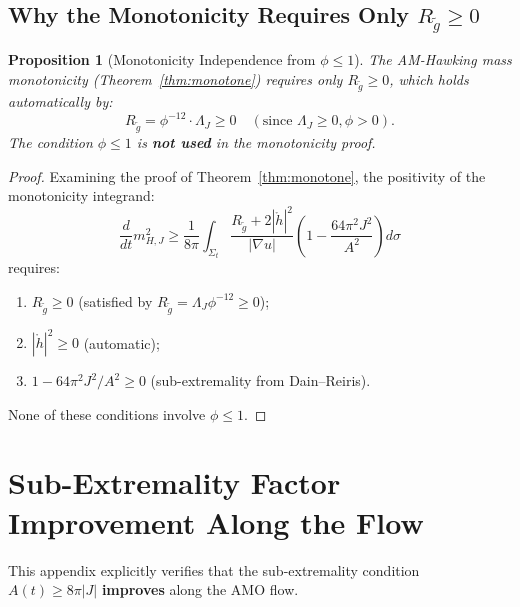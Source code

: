 \documentclass[12pt]{article}
\theoremstyle{plain}
\newtheorem{proposition}[theorem]{Proposition}
\theoremstyle{definition}
\theoremstyle{remark}
\newcommand{\tg}{\tilde{g}}
\begin{document}
\subsection{Why the Monotonicity Requires Only \texorpdfstring{$R_{\tg} \geq 0$}{R >= 0}}

\begin{proposition}[Monotonicity Independence from $\phi \leq 1$]\label{prop:mono-independence}
The AM-Hawking mass monotonicity (Theorem~\ref{thm:monotone}) requires only $R_{\tg} \geq 0$, which holds automatically by:
\[
R_{\tg} = \phi^{-12} \cdot \Lambda_J \geq 0 \quad (\text{since } \Lambda_J \geq 0, \phi > 0).
\]
The condition $\phi \leq 1$ is \textbf{not used} in the monotonicity proof.
\end{proposition}

\begin{proof}
Examining the proof of Theorem~\ref{thm:monotone}, the positivity of the monotonicity integrand:
\[
\frac{d}{dt}m_{H,J}^2 \geq \frac{1}{8\pi} \int_{\Sigma_t} \frac{R_{\tg} + 2|\mathring{h}|^2}{|\nabla u|} \left(1 - \frac{64\pi^2 J^2}{A^2}\right) d\sigma
\]
requires:
\begin{enumerate}
    \item $R_{\tg} \geq 0$ (satisfied by $R_{\tg} = \Lambda_J \phi^{-12} \geq 0$);
    \item $|\mathring{h}|^2 \geq 0$ (automatic);
    \item $1 - 64\pi^2 J^2/A^2 \geq 0$ (sub-extremality from Dain--Reiris).
\end{enumerate}
None of these conditions involve $\phi \leq 1$.
\end{proof}


\section{Sub-Extremality Factor Improvement Along the Flow}\label{app:subext-improvement}

This appendix explicitly verifies that the sub-extremality condition $A(t) \geq 8\pi|J|$ \textbf{improves} along the AMO flow.
\end{document}
